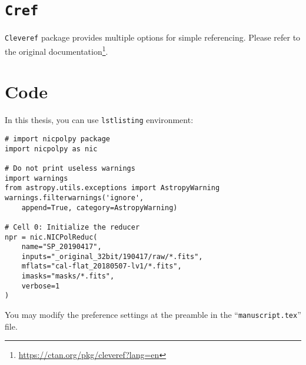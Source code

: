 \section{\texttt{Cref}}\label{ss:cref}
\texttt{Cleveref} package provides multiple options for simple referencing. Please refer to the original documentation\footnote{\url{https://ctan.org/pkg/cleveref?lang=en}}.

\section{Code}
In this thesis, you can use \texttt{lstlisting} environment:

\begin{lstlisting}
# import nicpolpy package
import nicpolpy as nic

# Do not print useless warnings
import warnings
from astropy.utils.exceptions import AstropyWarning
warnings.filterwarnings('ignore',
    append=True, category=AstropyWarning)

# Cell 0: Initialize the reducer
npr = nic.NICPolReduc(
    name="SP_20190417",
    inputs="_original_32bit/190417/raw/*.fits",
    mflats="cal-flat_20180507-lv1/*.fits",
    imasks="masks/*.fits",
    verbose=1
)
\end{lstlisting}

You may modify the preference settings at the preamble in the ``\texttt{manuscript.tex}'' file.